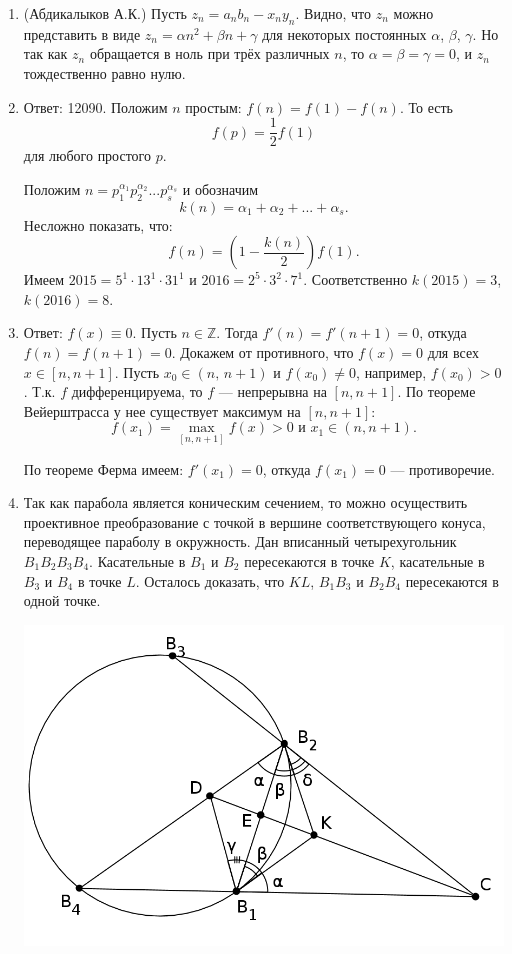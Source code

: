 \begin{enumerate}

\item (Абдикалыков А.К.) Пусть $z_n=a_nb_n-x_ny_n$. Видно, что $z_n$ можно представить в виде $z_n=\alpha n^2+\beta n+\gamma$ для некоторых постоянных $\alpha$, $\beta$, $\gamma$. Но так как $z_n$ обращается в ноль при трёх различных $n$, то $\alpha=\beta=\gamma=0$, и $z_n$ тождественно равно нулю.

\item Ответ: 12090. Положим $n$ простым: $f(n) = f(1) - f(n)$. То есть 
$$f(p) = \frac{1}{2}f(1)$$
для любого простого $p$.

Положим $n = p_1^{\alpha_1} p_2^{\alpha_2} ... p_s^{\alpha_s}$ и обозначим 
$$k(n) = \alpha_1 + \alpha_2 + ... + \alpha_s.$$
Несложно показать, что:
$$f(n) = \left( 1 - \frac{k(n)}{2} \right) f(1).$$
Имеем $2015 = 5^1 \cdot 13^1 \cdot 31^1$ и $2016 = 2^5 \cdot 3^2 \cdot 7^1$. Соответственно $k(2015) = 3$, $k(2016) = 8$.

\item Ответ: $f(x) \equiv 0$. Пусть $n \in \mathbb{Z}$. Тогда $f'(n) = f'(n+1) = 0$, откуда $f(n) = f(n+1) = 0$. Докажем от противного, что $f(x) = 0$ для всех $x \in [n, n+ 1]$. Пусть $x_0 \in (n, \,n+1)$ и $f(x_0) \neq 0$, например, $f(x_0) > 0$. Т.к. $f$ дифференцируема, то $f$ --- непрерывна на $[n, n+1]$. По теореме Вейерштрасса у нее существует максимум на $[n, n+1]$: 
$$f(x_1) = \max\limits_{[n, n+1]} f(x) > 0 \text{ и } x_1 \in (n, n+1).$$

По теореме Ферма имеем: $f'(x_1) = 0$, откуда $f(x_1) = 0$ --- противоречие.

\item Так как парабола является коническим сечением, то можно осуществить проективное преобразование с точкой в вершине соответствующего конуса, переводящее параболу в окружность. Дан вписанный четырехугольник $B_1B_2B_3B_4$. Касательные в $B_1$ и $B_2$ пересекаются в точке $K$, касательные в $B_3$ и $B_4$ в точке $L$. Осталось доказать, что $KL$, $B_1B_3$ и $B_2B_4$ пересекаются в одной точке.

\begin{center}
\includegraphics[width=0.8\linewidth]{pictures/2015-2016-4}
\end{center}


\end{enumerate}
